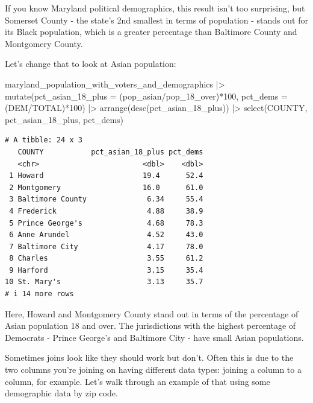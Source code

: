 \documentclass[
  letterpaper,
  DIV=11,
  numbers=noendperiod]{scrreprt}
\newenvironment{Shaded}{\begin{snugshade}}{\end{snugshade}}
\newcommand{\AttributeTok}[1]{\textcolor[rgb]{0.40,0.45,0.13}{#1}}
\newcommand{\DecValTok}[1]{\textcolor[rgb]{0.68,0.00,0.00}{#1}}
\newcommand{\FunctionTok}[1]{\textcolor[rgb]{0.28,0.35,0.67}{#1}}
\newcommand{\NormalTok}[1]{\textcolor[rgb]{0.00,0.23,0.31}{#1}}
\newcommand{\SpecialCharTok}[1]{\textcolor[rgb]{0.37,0.37,0.37}{#1}}
\begin{document}
If you know Maryland political demographics, this result isn't too
surprising, but Somerset County - the state's 2nd smallest in terms of
population - stands out for its Black population, which is a greater
percentage than Baltimore County and Montgomery County.

Let's change that to look at Asian population:

\begin{Shaded}
\begin{Highlighting}[]
\NormalTok{maryland\_population\_with\_voters\_and\_demographics }\SpecialCharTok{|\textgreater{}}
  \FunctionTok{mutate}\NormalTok{(}\AttributeTok{pct\_asian\_18\_plus =}\NormalTok{ (pop\_asian}\SpecialCharTok{/}\NormalTok{pop\_18\_over)}\SpecialCharTok{*}\DecValTok{100}\NormalTok{, }\AttributeTok{pct\_dems =}\NormalTok{ (DEM}\SpecialCharTok{/}\NormalTok{TOTAL)}\SpecialCharTok{*}\DecValTok{100}\NormalTok{) }\SpecialCharTok{|\textgreater{}}
  \FunctionTok{arrange}\NormalTok{(}\FunctionTok{desc}\NormalTok{(pct\_asian\_18\_plus)) }\SpecialCharTok{|\textgreater{}}
  \FunctionTok{select}\NormalTok{(COUNTY, pct\_asian\_18\_plus, pct\_dems)}
\end{Highlighting}
\end{Shaded}

\begin{verbatim}
# A tibble: 24 x 3
   COUNTY           pct_asian_18_plus pct_dems
   <chr>                        <dbl>    <dbl>
 1 Howard                       19.4      52.4
 2 Montgomery                   16.0      61.0
 3 Baltimore County              6.34     55.4
 4 Frederick                     4.88     38.9
 5 Prince George's               4.68     78.3
 6 Anne Arundel                  4.52     43.0
 7 Baltimore City                4.17     78.0
 8 Charles                       3.55     61.2
 9 Harford                       3.15     35.4
10 St. Mary's                    3.13     35.7
# i 14 more rows
\end{verbatim}

Here, Howard and Montgomery County stand out in terms of the percentage
of Asian population 18 and over. The jurisdictions with the highest
percentage of Democrats - Prince George's and Baltimore City - have
small Asian populations.

Sometimes joins look like they should work but don't. Often this is due
to the two columns you're joining on having different data types:
joining a column to a column, for example. Let's walk through an example
of that using some demographic data by zip code.
\end{document}
